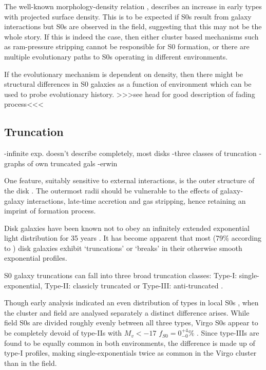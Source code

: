The well-known morphology-density relation \citep{dressler_galaxy_1980}, describes an increase in early types with projected surface density. This is to be expected if S0s result from galaxy interactions but S0s are observed in the field, suggesting that this may not be the whole story. If this is indeed the case, then either cluster based mechanisms such as ram-pressure stripping cannot be responsible for S0 formation, or there are multiple evolutionary paths to S0s operating in different environments. 

If the evolutionary mechanism is dependent on density, then there might be structural differences in S0 galaxies as a function of environment which can be used to probe evolutionary history.
>>>see head for good description of fading process<<<

\subsection{Truncation}
-infinite exp. doesn't describe completely, most disks
-three classes of truncation
-graphs of own truncated gals
-erwin



One feature, suitably sensitive to external interactions, is the outer structure of the disk \citep{pohlen_stellar_2004}. The outermost radii should be vulnerable to the effects of galaxy-galaxy interactions, late-time accretion and gas stripping, hence retaining an imprint of formation process. 

Disk galaxies have been known not to obey an infinitely extended exponential light distribution for 35 years \citep{van_der_kruit_optical_1979}. It has become apparent that most (79\% according to \citet{pohlen_cut-off_2001}) disk galaxies exhibit `truncations' or `breaks' in their otherwise smooth exponential profiles. 

S0 galaxy truncations can fall into three broad truncation classes: Type-I: single-exponential, Type-II: classicly truncated \citep{freeman_disks_1970} or Type-III: anti-truncated \citep{erwin_antitruncation_2005}. 
\begin{figure}
	\label{own sample examples on truncated types}
\end{figure}

Though early analysis indicated an even distribution of types in local S0s \citep{gutierrez_outer_2011}, when the cluster and field are analysed separately a distinct difference arises. While field S0s are divided roughly evenly between all three types, Virgo S0s appear to be completely devoid of type-IIs with $M_v < -17$ $f_{S0} = 0_{-0}^{+4}\%$ \citep{erwin_strong_2012}. Since type-IIIs are found to be equally common in both environments, the difference is made up of type-I profiles, making single-exponentials twice as common in the Virgo cluster than in the field. 

